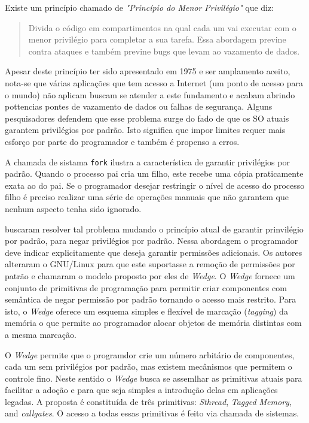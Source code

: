 Existe um princípio chamado de \emph{"Princípio do Menor Privilégio"} que diz:

\begin{quote}
Divida o código em compartimentos na qual cada um vai executar com o menor
privilégio para completar a sua tarefa. Essa abordagem previne contra ataques
e também previne bugs que levam ao vazamento de dados.
\citep{protectionprinciple}
\end{quote}

Apesar deste princípio ter sido apresentado em 1975 e ser amplamento aceito,
nota-se que várias aplicações que tem acesso a Internet (um ponto de acesso
para o mundo) não aplicam buscam se atender a este fundamento e acabam abrindo
pottencias pontes de vazamento de dados ou falhas de segurança. Alguns
pesquisadores defendem que esse problema surge do fado de que os SO atuais
garantem privilégios por padrão. Isto significa que impor limites requer mais
esforço por parte do programador e também é propenso a erros.

A chamada de sistama \texttt{fork} ilustra a característica de garantir
privilégios por padrão. Quando o processo pai cria um filho, este recebe uma
cópia praticamente exata ao do pai. Se o programador desejar restringir o
nível de acesso do processo filho é preciso realizar uma série de operações
manuais que não garantem que nenhum aspecto tenha sido ignorado.

\cite{wedge} buscaram resolver tal problema mudando o princípio atual de
garantir prinvilégio por padrão, para negar privilégios por padrão. Nessa
abordagem o programador deve indicar explicitamente que deseja garantir
permissões adicionais. Os autores alteraram o GNU/Linux para que este
suportasse a remoção de permissões por patrão e chamaram o modelo proposto por
eles de \emph{Wedge}. O \emph{Wedge} fornece um conjunto de primitivas de
programação para permitir criar componentes com semântica de negar permissão
por padrão tornando o acesso mais restrito. Para isto, o \emph{Wedge} oferece
um esquema simples e flexível de marcação (\emph{tagging}) da memória o que
permite ao programador alocar objetos de memória distintas com a mesma
marcação.

O \emph{Wedge} permite que o programdor crie um número arbitário de
componentes, cada um sem privilégios por padrão, mas existem mecânismos que
permitem o controle fino. Neste sentido o \emph{Wedge} busca se assemlhar as
primitivas atuais para facilitar a adoção e para que seja simples a introdução
delas em aplicações legadas. A proposta é constituída de três primitivas:
\emph{Sthread}, \emph{Tagged Memory}, and \emph{callgates}. O acesso a todas
essas primitivas é feito via chamada de sistemas.

